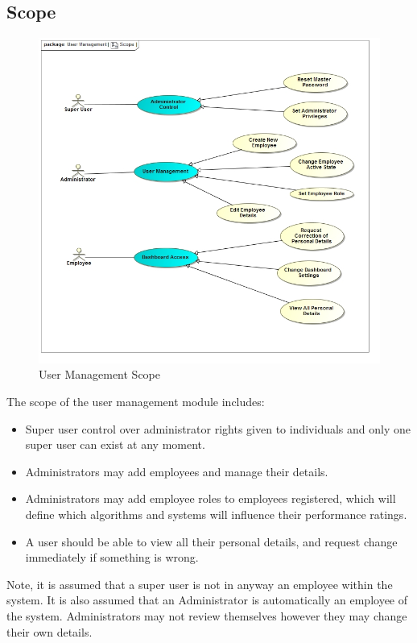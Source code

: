 \documentclass[11pt,a4paper]{article}
\begin{document}
\subsection{Scope}
\begin{figure}[H]
	\begin{center}
		\includegraphics[scale=0.6]{../Images/User_Management_Scope.jpg}
		\caption{User Management Scope}
	\end{center}
\end{figure}

\pagebreak

The scope of the user management module includes:
\begin{itemize}
	\item Super user control over administrator rights given to individuals and only one super user can exist at any moment.
	\item Administrators may add employees and manage their details.
	\item Administrators may add employee roles to employees registered, which will define which algorithms and systems will influence their performance ratings.
	\item A user should be able to view all their personal details, and request change immediately if something is wrong. 
\end{itemize}
Note, it is assumed that a super user is not in anyway an employee within the system. It is also assumed that an Administrator is automatically an employee of the system. Administrators may not review themselves however they may change their own details.
\end{document}
